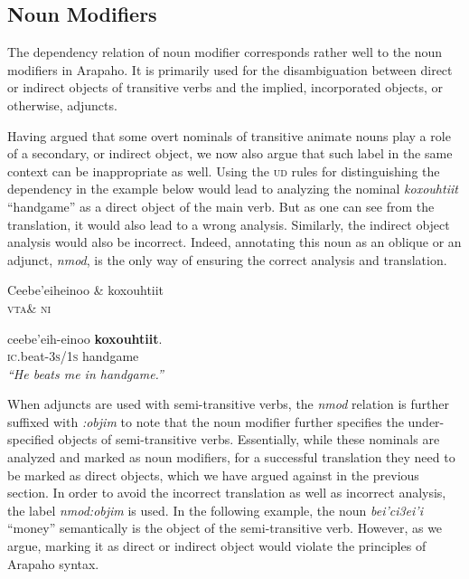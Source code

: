 \documentclass[11pt]{article}
\begin{document}
\subsection{Noun Modifiers}
The dependency relation of noun modifier corresponds rather well to the noun modifiers in Arapaho. It is primarily used for the disambiguation between direct or indirect objects of transitive verbs and the implied, incorporated objects, or otherwise, adjuncts.

Having argued that some overt nominals of transitive animate nouns play a role of a secondary, or indirect object, we now also  argue that such label in the same context can be inappropriate as well. Using the \textsc{ud} rules for distinguishing the dependency in the example below would lead to analyzing the nominal \textit{koxouhtiit} ``handgame'' as a direct object of the main verb. But as one can see from the translation, it would also lead to a wrong analysis. Similarly, the indirect object analysis would also be incorrect. Indeed, annotating this noun as an oblique or an adjunct, \textit{nmod}, is the only way of ensuring the correct analysis and translation. 

\small
\begin{exe}
\ex \label{handgame} 
\begin{dependency}
\begin{deptext}
Ceebe'eiheinoo \& koxouhtiit\\
\textsc{vta}\& \textsc{ni}\\
\end{deptext}
\end{dependency}
\gll ceebe'eih-einoo \textbf{koxouhtiit}.\\
\textsc{ic}.beat-\textsc{3s/1s} handgame\\
\trans \textit{``He beats me in handgame.''}
\end{exe}
\normalsize
When adjuncts are used with semi-transitive verbs, the \textit{nmod} relation is further suffixed with \textit{:objim} to note that the noun modifier further specifies the under-specified objects  of semi-transitive verbs. Essentially, while these nominals are analyzed and marked as noun modifiers, for a successful translation they need to be marked as direct objects, which we have argued against in the previous section. In order to avoid the incorrect translation as well as incorrect analysis, the label \textit{nmod:objim} is used. In the following example, the noun \textit{bei'ci3ei'i} ``money'' semantically is the object of the semi-transitive verb. However, as we argue, marking it as direct or indirect object would violate the principles of Arapaho syntax.
\end{document}

